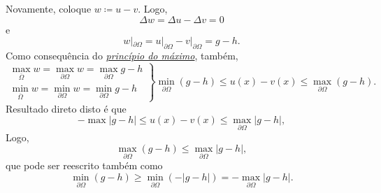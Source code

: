 \documentclass[../pde_notes.tex]{subfiles}
\begin{document}
Novamente, coloque \(w\coloneqq u-v\). Logo,
\[
	\Delta w = \Delta u - \Delta v = 0
\]
e
\[
	w|_{\partial \Omega } = u|_{\partial \Omega } - v|_{\partial \Omega } = g-h.
\]
Como consequência do \hyperlink{maximum_principle}{\textit{princípio do máximo}}, também,
\[
	\left.\begin{array}{ll}
		\max\limits_{\overline{\Omega }}w = \max\limits_{\partial \Omega }w = \max\limits_{\partial \Omega }g-h \\
		\min\limits_{\overline{\Omega }}w = \min\limits_{\partial \Omega}w = \min\limits_{\partial \Omega } g-h
	\end{array}\right\} \min\limits_{\partial \Omega }(g-h) \leq u(x)-v(x)\leq \max\limits_{\partial \Omega }(g-h).
\]
Resultado direto disto é que
\[
	-\max\limits_{}|g-h| \leq u(x)-v(x)\leq \max\limits_{\partial \Omega }|g-h|,
\]
Logo,
\[
	\max\limits_{\partial \Omega }(g-h) \leq \max\limits_{\partial \Omega }|g-h|,
\]
que pode ser reescrito também como
\[
	\min\limits_{\partial \Omega }(g-h) \geq \min\limits_{\partial \Omega }(-|g-h|) = -\max\limits_{\partial \Omega }|g-h|.
\]
\end{document}
